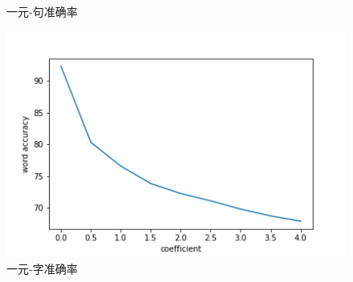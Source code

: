 \documentclass{article}
\begin{document}
\begin{spacing}{1.1}
\begin{figure}[h]
\begin{minipage}{0.2\linewidth}
		\caption{一元-句准确率}
	\end{minipage}
	\begin{minipage}{0.2\linewidth}
		\centering
		\includegraphics[width=1\linewidth]{pic/accuracy04.png}
		\caption{一元-字准确率}
	\end{minipage}
\end{figure}
	

\end{spacing}
\end{document}
